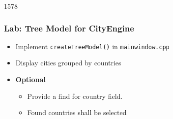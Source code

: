 \begin{slide}{1578}\frametitle{Lab: Tree Model for CityEngine}
  \begin{itemize}
    \item Implement \texttt{createTreeModel()} in \texttt{mainwindow.cpp}
    \item Display cities grouped by countries
    \item \textbf{Optional}
      \begin{itemize}
     \item Provide a find for country field.
     \item Found countries shall be selected
      \end{itemize}


 \end{itemize}
\end{slide}


